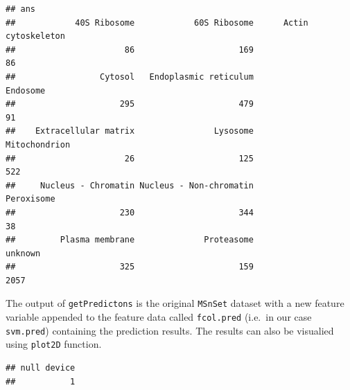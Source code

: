 \begin{Shaded}
\begin{Highlighting}[]
\StringTok{ }
                      \NormalTok{,}
                      \NormalTok{, }
                      \NormalTok{,}
                      
\end{Highlighting}
\end{Shaded}

\begin{verbatim}
## ans
##            40S Ribosome            60S Ribosome      Actin cytoskeleton 
##                      86                     169                      86 
##                 Cytosol   Endoplasmic reticulum                Endosome 
##                     295                     479                      91 
##    Extracellular matrix                Lysosome           Mitochondrion 
##                      26                     125                     522 
##     Nucleus - Chromatin Nucleus - Non-chromatin              Peroxisome 
##                     230                     344                      38 
##         Plasma membrane              Proteasome                 unknown 
##                     325                     159                    2057
\end{verbatim}

The output of \texttt{getPredictons} is the original \texttt{MSnSet}
dataset with a new feature variable appended to the feature data called
\texttt{fcol.pred} (i.e.~in our case \texttt{svm.pred}) containing the
prediction results. The results can also be visualied using
\texttt{plot2D} function.

\begin{Shaded}
\begin{Highlighting}[]
\NormalTok{()}
\end{Highlighting}
\end{Shaded}

\begin{verbatim}
## null device 
##           1
\end{verbatim}

\begin{Shaded}
\begin{Highlighting}[]
 \NormalTok{)}
\end{Highlighting}
\end{Shaded}

